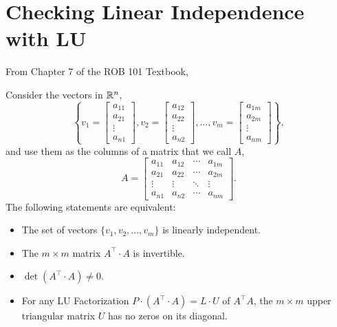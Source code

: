 \section{Checking Linear Independence with LU}

From Chapter 7 of the ROB 101 Textbook,

\begin{tcolorbox}[sharp corners, colback=green!30, colframe=green!80!blue,
title=\textbf{Pro-tip! Linear Independence in a Nutshell}]
Consider the vectors in $\mathbb R^n$,
$$\left\{v_1=\begin{bmatrix} a_{11} \\ a_{21}\\ \vdots \\ a_{n1} \end{bmatrix},  v_2=\begin{bmatrix} a_{12} \\ a_{22}\\ \vdots \\ a_{n2} \end{bmatrix}, ...,  v_m=\begin{bmatrix} a_{1m} \\ a_{2m}\\ \vdots \\ a_{nm} \end{bmatrix} \right\},$$ 
and use them as the columns of a matrix that we call $A$,
\begin{equation}
\label{eq:MatrixFromLinearIndependence_proTipC}    
A=\left[\begin{array}{cccc} a_{11}& a_{12}& \cdots & a_{1m} \\
 a_{21}& a_{22}& \cdots & a_{2m}  \\
 \vdots & \vdots&  \ddots & \vdots \\
 a_{n1}& a_{n2}& \cdots & a_{nm} 
 \end{array}\right].
 \end{equation}
 The following statements are equivalent:
 \begin{itemize}
     \item  The set of vectors $ \{v_1, v_2, \ldots, v_m \} $ is linearly independent.
     \item The $m \times m$ matrix $A^\top \cdot A$ is invertible. 
     \item $\det(A^\top \cdot A) \neq 0$.
     \item For any LU Factorization $P \cdot (A^\top \cdot A) = L \cdot U$  of $A^\top A$, the $m \times m$ upper triangular matrix $U$ has no zeros on its diagonal.
 \end{itemize}
\end{tcolorbox}

